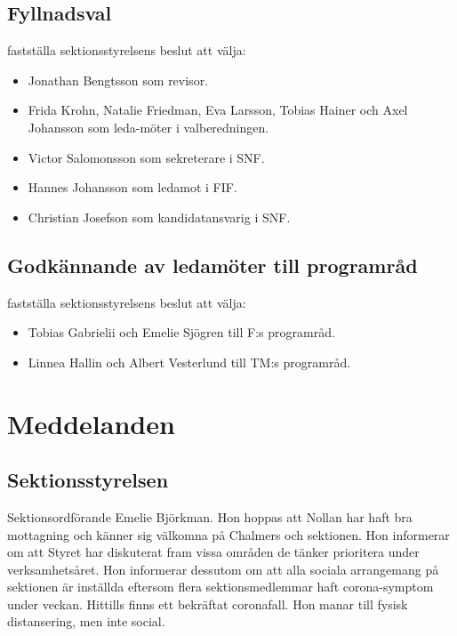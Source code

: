 \documentclass[hidelinks]{sektionsmote}
\begin{document}
\subsection{Fyllnadsval}
\begin{beslut}
    \item fastställa sektionsstyrelsens beslut att välja:
    \begin{itemize}
        \item Jonathan Bengtsson som revisor.
        \item Frida Krohn, Natalie Friedman, Eva Larsson, Tobias Hainer och Axel Johansson som leda-möter i valberedningen.
        \item Victor Salomonsson som sekreterare i SNF.
        \item Hannes Johansson som ledamot i FIF.
        \item Christian Josefson som kandidatansvarig i SNF.
    \end{itemize}
\end{beslut}

\subsection{Godkännande av ledamöter till programråd}
\begin{beslut}
    \item fastställa sektionsstyrelsens beslut att välja:
    \begin{itemize}
        \item Tobias Gabrielii och Emelie Sjögren till F:s programråd.
        \item Linnea Hallin och Albert Vesterlund till TM:s programråd.
    \end{itemize}
\end{beslut}


\section{Meddelanden}

\subsection{Sektionsstyrelsen}
Sektionsordförande Emelie Björkman.
Hon hoppas att Nollan har haft bra mottagning och känner sig välkomna på Chalmers och sektionen.
Hon informerar om att Styret har diskuterat fram vissa områden de tänker prioritera under verksamhetsåret.
Hon informerar dessutom om att alla sociala arrangemang på sektionen är inställda eftersom flera sektionsmedlemmar haft corona-symptom under veckan.
Hittills finns ett bekräftat coronafall.
Hon manar till fysisk distansering, men inte social.
\end{document}

